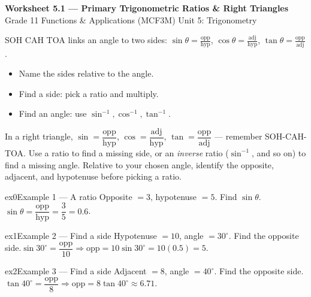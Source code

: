 \documentclass[11pt]{article}
\begin{document}
\begin{center}
{\LARGE\bfseries\color{titleblue}Worksheet 5.1 --- Primary Trigonometric Ratios \& Right Triangles}\\[2pt]
{\small Grade 11 Functions \& Applications (MCF3M) \textperiodcentered{} Unit 5: Trigonometry}
\end{center}

\begin{ideabox}
SOH CAH TOA links an angle to two sides: $\sin\theta=\frac{\text{opp}}{\text{hyp}}$, $\cos\theta=\frac{\text{adj}}{\text{hyp}}$, $\tan\theta=\frac{\text{opp}}{\text{adj}}$.
\begin{itemize}[leftmargin=*,itemsep=2pt]
  \item Name the sides relative to the angle.
  \item Find a side: pick a ratio and multiply.
  \item Find an angle: use $\sin^{-1},\cos^{-1},\tan^{-1}$.
\end{itemize}
\end{ideabox}

\begin{learnbox}
In a right triangle, $\sin=\dfrac{\text{opp}}{\text{hyp}}$, $\cos=\dfrac{\text{adj}}{\text{hyp}}$, $\tan=\dfrac{\text{opp}}{\text{adj}}$ — remember SOH-CAH-TOA.
Use a ratio to find a missing side, or an \emph{inverse} ratio ($\sin^{-1}$, and so on) to find a missing angle.
Relative to your chosen angle, identify the opposite, adjacent, and hypotenuse before picking a ratio.
\end{learnbox}


\begin{example}{ex0}{Example 1 --- A ratio}
Opposite $=3$, hypotenuse $=5$. Find $\sin\theta$.\soln $\sin\theta=\dfrac{\text{opp}}{\text{hyp}}=\dfrac35=0.6$.
\end{example}

\begin{example}{ex1}{Example 2 --- Find a side}
Hypotenuse $=10$, angle $=30^\circ$. Find the opposite side.\soln $\sin30^\circ=\dfrac{\text{opp}}{10}\Rightarrow \text{opp}=10\sin30^\circ=10(0.5)=5$.
\end{example}

\begin{example}{ex2}{Example 3 --- Find a side}
Adjacent $=8$, angle $=40^\circ$. Find the opposite side.\soln $\tan40^\circ=\dfrac{\text{opp}}{8}\Rightarrow \text{opp}=8\tan40^\circ\approx6.71$.
\end{example}
\end{document}
